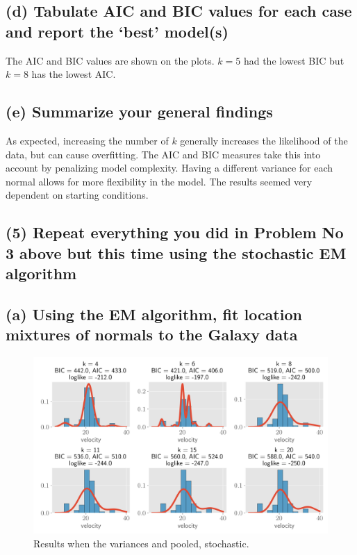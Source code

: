 \documentclass[11pt]{article}
\begin{document}
\newpage
\subsection*{(d) Tabulate AIC and BIC values for each case and report the ‘best’ model(s)}

The AIC and BIC values are shown on the plots. $k =5$ had the lowest BIC but $k=8$ has the lowest AIC.


\subsection*{(e) Summarize your general findings}
As expected, increasing the number of $k$ generally increases the likelihood of the data, but can cause overfitting. The AIC and BIC measures take this into account by penalizing model complexity. Having a different variance for each normal allows for more flexibility in the model. The results seemed very dependent on starting conditions.

\subsection*{(5) Repeat everything you did in Problem No 3 above but this time using the stochastic EM algorithm}

\subsection*{ (a) Using the EM algorithm, fit location mixtures of normals to the Galaxy data}

\begin{figure}[!h]
    \centering
    \includegraphics[scale=.6
    ]{homework_4/figures/galaxies_3.png}
    \caption{Results when the variances and pooled, stochastic.}
    \label{fig:my_label}
\end{figure}
\newpage
\end{document}
